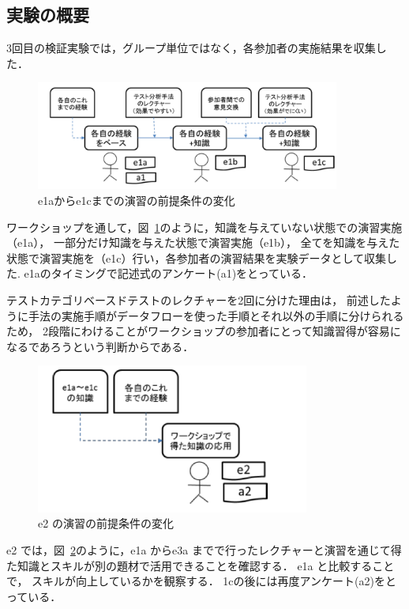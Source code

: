 \subsection{実験の概要}
3回目の検証実験では，グループ単位ではなく，各参加者の実施結果を収集した\cite{yumoto2016ICST}．
\begin{figure}[h]
\begin{center}
\includegraphics[width=10cm]{./image/D-3-Fig8.png}
\caption{e1aからe1cまでの演習の前提条件の変化}
\label{fig:D-3-Fig8}
\end{center}
\end{figure}
ワークショップを通して，図~\ref{fig:D-3-Fig8}のように，知識を与えていない状態での演習実施（e1a），
一部分だけ知識を与えた状態で演習実施（e1b），
全てを知識を与えた状態で演習実施を（e1c）行い，各参加者の演習結果を実験データとして収集した.
e1aのタイミングで記述式のアンケート(a1)をとっている．

テストカテゴリベースドテストのレクチャーを2回に分けた理由は， 前述したように手法の実施手順がデータフローを使った手順とそれ以外の手順に分けられるため， 2段階にわけることがワークショップの参加者にとって知識習得が容易になるであろうという判断からである．

\begin{figure}[h]
\begin{center}
\includegraphics[width=9cm]{./image/D-3-Fig9.png}
\caption{e2 の演習の前提条件の変化}
\label{fig:D-3-Fig9}
\end{center}
\end{figure}
e2 では，図~\ref{fig:D-3-Fig9}のように，e1a からe3a までで行ったレクチャーと演習を通じて得た知識とスキルが別の題材で活用できることを確認する． e1a と比較することで， スキルが向上しているかを観察する．
1cの後には再度アンケート(a2)をとっている．

